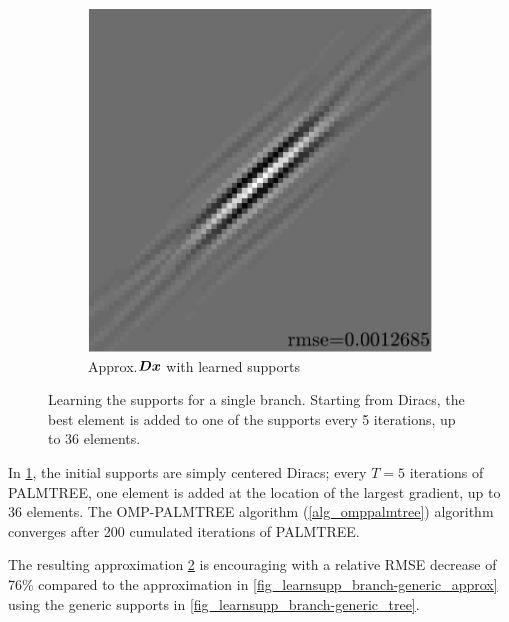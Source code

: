 \begin{figure}[!ht]
\begin{subfigure}[b]{0.085\textwidth}
\caption{}\label{fig_learnsupp_branch-learned_tree}
\end{subfigure}
\begin{subfigure}[b]{0.39\textwidth}\centering
\includegraphics[width=\textwidth]{figures/variable_support/xp_128x128_sc2_angl1_K3_S3_node4_variable_approx.pdf}
\caption{Approx.\@ $\bm{D}\bm{x}$ with learned supports}\label{fig_learnsupp_branch-learned_approx}
\end{subfigure}
\caption{Learning the supports for a single branch. Starting from Diracs, the best element is added to one of the supports every 5 iterations, up to 36 elements.}\label{fig_learnsupp_branch}
\end{figure}

\noindent
In \cref{fig_learnsupp_branch-learned_tree}, the initial supports are simply centered Diracs; every $T=5$ iterations of \ac{PALMTREE}, one element is added at the location of the largest gradient, up to 36 elements. The OMP-PALMTREE algorithm (\cref{alg_omppalmtree}) algorithm converges after 200 cumulated iterations of \ac{PALMTREE}.

\noindent
The resulting approximation \cref{fig_learnsupp_branch-learned_approx} is encouraging with a relative RMSE decrease of 76\% compared to the approximation in \cref{fig_learnsupp_branch-generic_approx} using the generic supports in \cref{fig_learnsupp_branch-generic_tree}.

